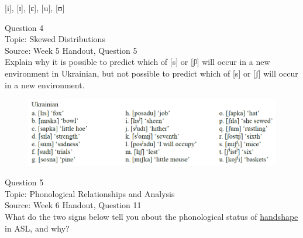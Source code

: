 \documentclass[12pt]{article}
\begin{document}
{[i]}, {[ɪ]}, {[ɛ]}, {[u]}, {[ʊ]}


\newpage

{\large Question 4}\\

Topic: Skewed Distributions\\
Source: Week 5 Handout, Question 5\\

Explain why it is possible to predict which of [s] or [ʃʲ] will occur in a new environment in Ukrainian, but not possible to predict which of [s] or [ʃ] will occur in a new environment.\\

\begin{figure}[H]
\includegraphics{../images/ukrainian.png}
\end{figure}

\newpage

{\large Question 5}\\

Topic: Phonological Relationships and Analysis\\
Source: Week 6 Handout, Question 11\\

What do the two signs below tell you about the phonological status of \underline{handshape} in ASL, and why?\\
\end{document}
